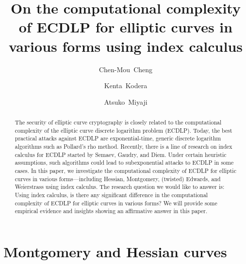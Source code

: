 \documentclass{llncs}
\begin{document}
%
\title{On the computational complexity of ECDLP for elliptic curves in
  various forms using index calculus}
%
%
\author{Chen-Mou~Cheng \and Kenta~Kodera \and Atsuko~Miyaji}
%
%

\maketitle              %

\begin{abstract}
%
  The security of elliptic curve cryptography is closely related to
  the computational complexity of the elliptic curve discrete
  logarithm problem (ECDLP).
%
  Today, the best practical attacks against ECDLP are
  exponential-time, generic discrete logarithm algorithms such as
  Pollard's rho method.
%
  Recently, there is a line of research on index calculus for ECDLP
  started by Semaev, Gaudry, and
  Diem.
%
  Under certain heuristic assumptions, such algorithms could lead to
  subexponential attacks to ECDLP in some
  cases.
%
  In this paper, we investigate the computational complexity of ECDLP
  for elliptic curves in various forms---including
  Hessian,
  Montgomery, (twisted)
  Edwards,
  and Weierstrass using index calculus.
%
  The research question we would like to answer is: Using index
  calculus, is there any significant difference in the computational
  complexity of ECDLP for elliptic curves in various forms?
%
  We will provide some empirical evidence and insights showing an
  affirmative answer in this paper.
%
\end{abstract}



\section{Montgomery and Hessian curves}
\label{sec:montgomery-hessian}






%
%


\end{document}
